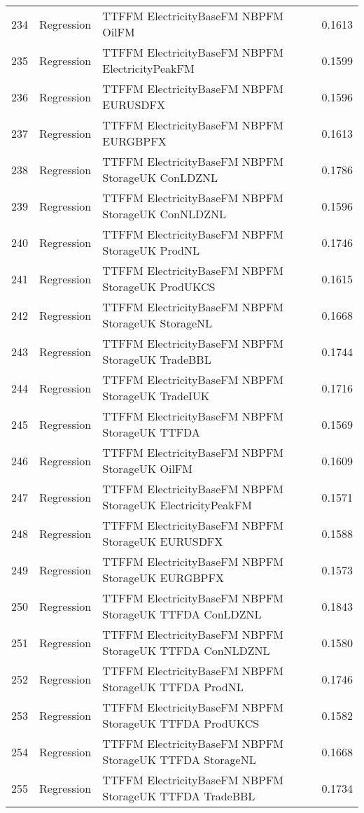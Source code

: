 \begin{table}[ht]
\begin{tabular}{rllr}
  234 & Regression & TTFFM ElectricityBaseFM NBPFM OilFM & 0.1613 \\ 
  235 & Regression & TTFFM ElectricityBaseFM NBPFM ElectricityPeakFM & 0.1599 \\ 
  236 & Regression & TTFFM ElectricityBaseFM NBPFM EURUSDFX & 0.1596 \\ 
  237 & Regression & TTFFM ElectricityBaseFM NBPFM EURGBPFX & 0.1613 \\ 
  238 & Regression & TTFFM ElectricityBaseFM NBPFM StorageUK ConLDZNL & 0.1786 \\ 
  239 & Regression & TTFFM ElectricityBaseFM NBPFM StorageUK ConNLDZNL & 0.1596 \\ 
  240 & Regression & TTFFM ElectricityBaseFM NBPFM StorageUK ProdNL & 0.1746 \\ 
  241 & Regression & TTFFM ElectricityBaseFM NBPFM StorageUK ProdUKCS & 0.1615 \\ 
  242 & Regression & TTFFM ElectricityBaseFM NBPFM StorageUK StorageNL & 0.1668 \\ 
  243 & Regression & TTFFM ElectricityBaseFM NBPFM StorageUK TradeBBL & 0.1744 \\ 
  244 & Regression & TTFFM ElectricityBaseFM NBPFM StorageUK TradeIUK & 0.1716 \\ 
  245 & Regression & TTFFM ElectricityBaseFM NBPFM StorageUK TTFDA & 0.1569 \\ 
  246 & Regression & TTFFM ElectricityBaseFM NBPFM StorageUK OilFM & 0.1609 \\ 
  247 & Regression & TTFFM ElectricityBaseFM NBPFM StorageUK ElectricityPeakFM & 0.1571 \\ 
  248 & Regression & TTFFM ElectricityBaseFM NBPFM StorageUK EURUSDFX & 0.1588 \\ 
  249 & Regression & TTFFM ElectricityBaseFM NBPFM StorageUK EURGBPFX & 0.1573 \\ 
  250 & Regression & TTFFM ElectricityBaseFM NBPFM StorageUK TTFDA ConLDZNL & 0.1843 \\ 
  251 & Regression & TTFFM ElectricityBaseFM NBPFM StorageUK TTFDA ConNLDZNL & 0.1580 \\ 
  252 & Regression & TTFFM ElectricityBaseFM NBPFM StorageUK TTFDA ProdNL & 0.1746 \\ 
  253 & Regression & TTFFM ElectricityBaseFM NBPFM StorageUK TTFDA ProdUKCS & 0.1582 \\ 
  254 & Regression & TTFFM ElectricityBaseFM NBPFM StorageUK TTFDA StorageNL & 0.1668 \\ 
  255 & Regression & TTFFM ElectricityBaseFM NBPFM StorageUK TTFDA TradeBBL & 0.1734 \\ 

\end{tabular}
\end{table}
